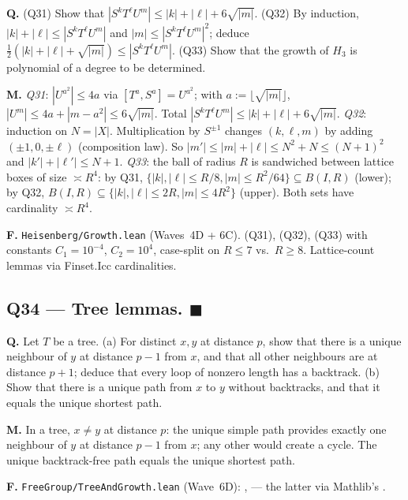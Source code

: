 \documentclass[11pt,a4paper]{article}
\newcommand{\done}[1]{\textcolor{donegreen}{\textbf{#1}}}
\newcommand{\lmod}[1]{\texttt{\small #1}}
\theoremstyle{plain}
\theoremstyle{definition}
\begin{document}
\textbf{Q.} (Q31) Show that $|S^k T^\ell U^m| \leq |k| + |\ell| + 6\sqrt{|m|}$.
(Q32) By induction, $|k| + |\ell| \leq |S^k T^\ell U^m|$ and
$|m| \leq |S^k T^\ell U^m|^2$; deduce
$\tfrac12(|k|+|\ell|+\sqrt{|m|}) \leq |S^k T^\ell U^m|$.
(Q33) Show that the growth of $H_3$ is polynomial of a degree to
be determined.

\textbf{M.} \emph{Q31}: $|U^{a^2}| \leq 4a$ via $[T^a, S^a] = U^{a^2}$;
with $a := \lfloor\sqrt{|m|}\rfloor$, $|U^m| \leq 4a +
|m - a^2| \leq 6\sqrt{|m|}$. Total
$|S^k T^\ell U^m| \leq |k| + |\ell| + 6\sqrt{|m|}$.
\emph{Q32}: induction on $N = |X|$. Multiplication by $S^{\pm 1}$
changes $(k, \ell, m)$ by adding $(\pm 1, 0, \pm \ell)$ (composition
law). So $|m'| \leq |m| + |\ell| \leq N^2 + N \leq (N+1)^2$ and
$|k'| + |\ell'| \leq N + 1$.
\emph{Q33}: the ball of radius $R$ is sandwiched between lattice
boxes of size $\asymp R^4$: by Q31,
$\{|k|, |\ell| \leq R/8, |m| \leq R^2/64\} \subseteq B(I, R)$ (lower);
by Q32, $B(I, R) \subseteq \{|k|, |\ell| \leq 2R, |m| \leq 4 R^2\}$
(upper). Both sets have cardinality $\asymp R^4$.

\textbf{F.} \lmod{Heisenberg/Growth.lean} (Waves~4D + 6C).
 (Q31),
 (Q32),
 (Q33) with constants
$C_1 = 10^{-4}$, $C_2 = 10^4$, case-split on $R \leq 7$ vs.\ $R \geq 8$.
Lattice-count lemmas via Finset.Icc cardinalities.

\subsection{Q34 --- Tree lemmas. \done{$\blacksquare$}}

\textbf{Q.} Let $T$ be a tree. (a) For distinct $x, y$ at distance
$p$, show that there is a unique neighbour of $y$ at distance
$p-1$ from $x$, and that all other neighbours are at distance $p+1$;
deduce that every loop of nonzero length has a backtrack.
(b) Show that there is a unique path from $x$ to $y$ without
backtracks, and that it equals the unique shortest path.

\textbf{M.} In a tree, $x \neq y$ at distance $p$: the unique
simple path provides exactly one neighbour of $y$ at distance
$p-1$ from $x$; any other would create a cycle. The unique
backtrack-free path equals the unique shortest path.

\textbf{F.} \lmod{FreeGroup/TreeAndGrowth.lean}
(Wave~6D): ,
 --- the latter via Mathlib's
.
\end{document}
